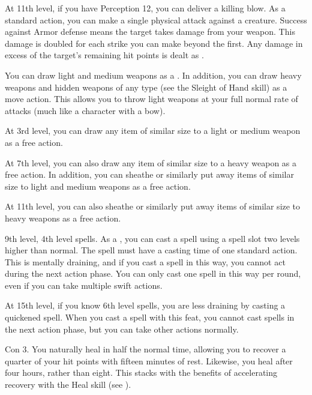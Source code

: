     At 11th level, if you have Perception 12, you can deliver a killing blow.
    As a standard action, you can make a single physical attack against a creature.
    Success against Armor defense means the target takes damage from your weapon.
    This damage is doubled for each strike you can make beyond the first.
    Any damage in excess of the target's remaining hit points is dealt as .

    \featben You can draw light and medium weapons as a .
    In addition, you can draw heavy weapons and hidden weapons of any type (see the Sleight of Hand skill) as a move action.
    This allows you to throw light weapons at your full normal rate of attacks (much like a character with a bow).

    At 3rd level, you can draw any item of similar size to a light or medium weapon as a free action.

    At 7th level, you can also draw any item of similar size to a heavy weapon as a free action.
    In addition, you can sheathe or similarly put away items of similar size to light and medium weapons as a free action.

    At 11th level, you can also sheathe or similarly put away items of similar size to heavy weapons as a free action.

    \featpre 9th level, 4th level spells.
    \featben As a , you can cast a spell using a spell slot two levels higher than normal.
    The spell must have a casting time of one standard action.
    This is mentally draining, and if you cast a spell in this way, you cannot act during the next action phase.
    You can only cast one spell in this way per round, even if you can take multiple swift actions.

    At 15th level, if you know 6th level spells, you are less draining by casting a quickened spell.
    When you cast a spell with this feat, you cannot cast spells in the next action phase, but you can take other actions normally.

    \featpre Con 3.
    \featben You naturally heal in half the normal time, allowing you to recover a quarter of your hit points with fifteen minutes of rest.
    Likewise, you heal  after four hours, rather than eight.
    This stacks with the benefits of accelerating recovery with the Heal skill (see ).

